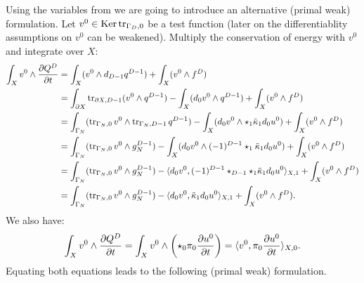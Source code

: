 \begin{discussion}
  Using the variables from
  we are going to introduce an alternative (primal weak) formulation.
  Let $v^0 \in \mathop{\rm Ker}\nolimits \mathop{\rm tr}\nolimits_{\Gamma_D, 0}$ be a test function
  (later on the differentiablity assumptions on $v^0$ can be weakened).
  Multiply the conservation of energy with $v^0$ and integrate over $X$:
  \begin{equation}
    \begin{split}
      \int_X v^0 \wedge \frac{\partial Q^D}{\partial t}
      & = \int_X (v^0 \wedge d_{D - 1} q^{D - 1}) + \int_X (v^0 \wedge f^D) \\
      & = \int_{\partial X} \mathop{\rm tr}\nolimits_{\partial X, D - 1} (v^0 \wedge q^{D - 1})
        - \int_X (d_0 v^0 \wedge q^{D - 1})
        + \int_X (v^0 \wedge f^D) \\
      & =
        \int_{\Gamma_N}
          (\mathop{\rm tr}\nolimits_{\Gamma_N, 0} v^0 \wedge \mathop{\rm tr}\nolimits_{\Gamma_N, D - 1} q^{D - 1})
        - \int_X (d_0 v^0 \wedge \star_1 \tilde{\kappa}_1 d_0 u^0)
        + \int_X (v^0 \wedge f^D) \\
      & = \int_{\Gamma_N} (\mathop{\rm tr}\nolimits_{\Gamma_N, 0} v^0 \wedge g_N^{D - 1})
        - \int_X (d_0 v^0 \wedge (-1)^{D - 1} \star_1 \tilde{\kappa}_1 d_0 u^0)
        + \int_X (v^0 \wedge f^D) \\
      & = \int_{\Gamma_N} (\mathop{\rm tr}\nolimits_{\Gamma_N, 0} v^0 \wedge g_N^{D - 1})
        - \langle d_0 v^0,(-1)^{D - 1} \star_{D - 1} \star_1 \tilde{\kappa}_1 d_0 u^0\rangle_{X, 1}
        + \int_X (v^0 \wedge f^D) \\
      & = \int_{\Gamma_N} (\mathop{\rm tr}\nolimits_{\Gamma_N, 0} v^0 \wedge g_N^{D - 1})
        - \langle d_0 v^0,\tilde{\kappa}_1 d_0 u^0\rangle_{X, 1}
        + \int_X (v^0 \wedge f^D).
    \end{split}
  \end{equation}
  We also have:
  \begin{equation}
    \int_X v^0 \wedge \frac{\partial Q^D}{\partial t}
    = \int_X v^0 \wedge
      \left(\star_0 \pi_0 \frac{\partial u^0}{\partial t}\right)
    =  \langle v^0,\pi_0 \frac{\partial u^0}{\partial t}\rangle_{X, 0}.
  \end{equation}
  Equating both equations leads to the following (primal weak) formulation.
\end{discussion}
